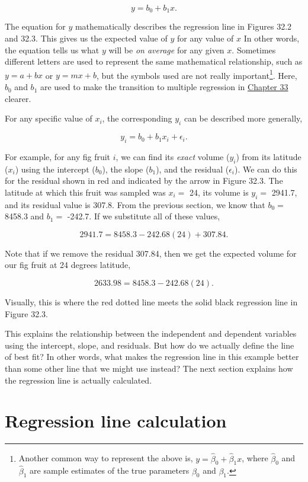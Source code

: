 \documentclass[
  openany]{krantz}
\begin{document}
\[y = b_{0} + b_{1}x.\]

The equation for \(y\) mathematically describes the regression line in Figures 32.2 and 32.3.
This gives us the expected value of \(y\) for any value of \(x\)
In other words, the equation tells us what \(y\) will be \emph{on average} for any given \(x\).
Sometimes different letters are used to represent the same mathematical relationship, such as \(y = a + bx\) or \(y = mx + b\), but the symbols used are not really important\footnote{Another common way to represent the above is, \(y = \hat{\beta}_{0} + \hat{\beta}_{1}x\), where \(\hat{\beta}_{0}\) and \(\hat{\beta}_{1}\) are sample estimates of the true parameters \({\beta}_{0}\) and \({\beta}_{1}\).}.
Here, \(b_{0}\) and \(b_{1}\) are used to make the transition to multiple regression in \protect\hyperlink{Chapter_33}{Chapter 33} clearer.

For any specific value of \(x_{i}\), the corresponding \(y_{i}\) can be described more generally,

\[y_{i} = b_{0} + b_{1}x_{i} + \epsilon_{i}.\]

For example, for any fig fruit \(i\), we can find its \emph{exact} volume (\(y_{i}\)) from its latitude (\(x_{i}\)) using the intercept (\(b_{0}\)), the slope (\(b_{1}\)), and the residual (\(\epsilon_{i}\)).
We can do this for the residual shown in red and indicated by the arrow in Figure 32.3.
The latitude at which this fruit was sampled was \(x_{i} =\) 24, its volume is \(y_{i} =\) 2941.7, and its residual value is 307.8.
From the previous section, we know that \(b_{0} =\) 8458.3 and \(b_{1} =\) -242.7.
If we substitute all of these values,

\[2941.7 = 8458.3 - 242.68(24) + 307.84.\]

Note that if we remove the residual 307.84, then we get the expected volume for our fig fruit at 24 degrees latitude,

\[2633.98 = 8458.3 - 242.68(24).\]

Visually, this is where the red dotted line meets the solid black regression line in Figure 32.3.

This explains the relationship between the independent and dependent variables using the intercept, slope, and residuals.
But how do we actually define the line of best fit?
In other words, what makes the regression line in this example better than some other line that we might use instead?
The next section explains how the regression line is actually calculated.

\hypertarget{regression-line-calculation}{%
\section{Regression line calculation}\label{regression-line-calculation}}
\end{document}
